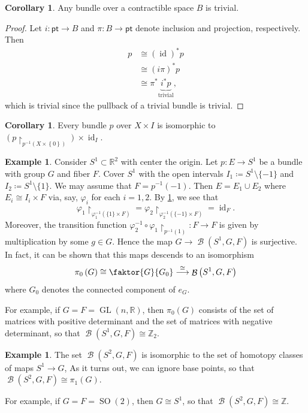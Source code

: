 \documentclass[10pt,letterpaper,cm]{nupset}
\theoremstyle{definition}
\newtheorem{exmp}[defn]{Example}
\theoremstyle{theorem}
\newtheorem{corollary}[defn]{Corollary}
\theoremstyle{remark}
\newcommand{\R}{\mathbb{R}}
\newcommand{\Z}{\mathbb Z}
\newcommand{\1}{\mathbb{1}}
\newcommand{\0}{\vec 0}
\newcommand{\pt}{\mathsf{pt}}
\DeclareMathOperator{\id}{id}
\DeclareMathOperator{\GL}{GL}
\DeclareMathOperator{\SO}{SO}
\DeclareMathOperator{\B}{\mathcal{B}}
\begin{document}
\begin{corollary}
Any bundle over a contractible space $B$ is trivial.
\end{corollary}
\begin{proof}
Let $i : \pt \to B$ and $\pi : B \to \pt$ denote inclusion and projection, respectively. Then 
\begin{align*}
p &  \cong \left(\id\right)^{\ast}{p}
\\ & \cong \left(i{\pi}\right)^{\ast}{p}
\\ & \cong \pi^{\ast}\underbrace{{i^{\ast}}{p}}_{\text{trivial}},
\end{align*}
which is trivial since the pullback of a trivial bundle is trivial.
\end{proof}

\begin{corollary}\label{restiso}
Every bundle $p$ over $X\times I$ is isomorphic to $\left(p\restriction_{p^{-1}\left(X\times \left\{0\right\}\right)}\right) \times \id_I$.
\end{corollary}

\begin{exmp}
Consider $S^1 \subset \R^2$ with center the origin. Let $p: E \to S^1$ be a bundle with group $G$ and fiber $F$. Cover $S^1$ with the open intervals $I_1 \coloneqq S^1\setminus \{{-1}\}$ and $I_2 \coloneqq S^1\setminus \{1\}$. We may assume that $F= p^{-1}\left({-1}\right)$. Then $E = E_1 \cup E_2$ where $ E_i \cong I_i \times F$ via, say, $\varphi_i$ for each $i=1,2$. By \cref{restiso}, we see that $$\varphi_1\restriction_{\varphi_1^{-1}\left(\{1\} \times F\right)} = \varphi_2\restriction_{\varphi_2^{-1}\left(\{{-1}\} \times F\right)}= \id_F.$$ Moreover, the transition function $\varphi_2^{-1} \circ \varphi_1\restriction_{p^{-1}\left(1\right)} : F \to F$ is given by multiplication by some $g\in G$. Hence the map $G \to \B\left(S^1, G, F\right)$ is surjective. In fact, it can be shown that this maps descends to an isomorphism
$$\pi_0\left(G\right) \cong \faktor{G}{G_0} \overset{\cong}{\longrightarrow} \B\left(S^1, G, F\right)$$ 
where $G_0$ denotes the connected component of $e_G$. 

\smallskip

For example, if $G=F = \GL\left(n, \R\right)$, then $\pi_0(G)$ consists of the set of matrices with positive determinant and the set of matrices with negative determinant, so that $\B\left(S^1, G, F\right) \cong \Z_2$.
\end{exmp}

\begin{exmp}
The set $\B\left(S^2, G, F \right)$ is isomorphic to the set of homotopy classes of maps $S^1 \to G$, As it turns out, we can ignore base points, so that  $\B\left(S^2, G, F \right) \cong \pi_1\left(G\right)$. 

\smallskip

For example, if $G = F = \SO(2)$, then $G\cong S^1$, so that $\B\left(S^2, G, F \right) \cong \Z$.
\end{exmp}
\end{document}

